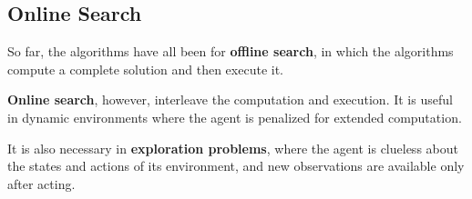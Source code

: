 \begin{multicols*}{2}
    \subsection{Online Search}
        So far, the algorithms have all been for \textbf{offline search}, in which the algorithms compute a complete solution and then execute it.

        \textbf{Online search}, however, interleave the computation and execution. It is useful in dynamic environments where the agent is penalized for extended computation.

        It is also necessary in \textbf{exploration problems}, where the agent is clueless about the states and actions of its environment, and new observations are available only after acting.

\end{multicols*}